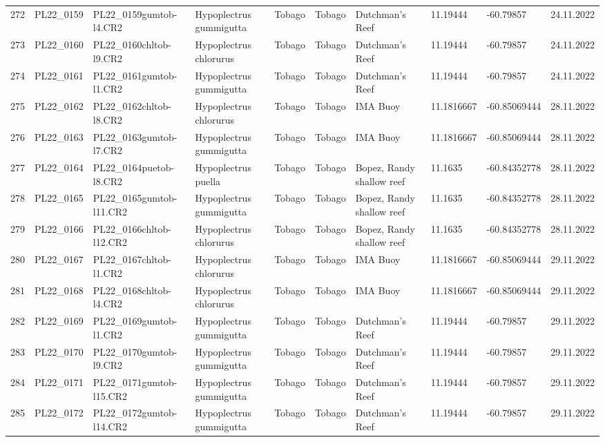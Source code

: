 \begin{table}[ht]
\begin{tabular}{rlllllllll}
  272 & PL22\_0159 & PL22\_0159gumtob-l4.CR2 & Hypoplectrus gummigutta & Tobago & Tobago & Dutchman's Reef & 11.19444 & -60.79857 & 24.11.2022 \\ 
  273 & PL22\_0160 & PL22\_0160chltob-l9.CR2 & Hypoplectrus chlorurus & Tobago & Tobago & Dutchman's Reef & 11.19444 & -60.79857 & 24.11.2022 \\ 
  274 & PL22\_0161 & PL22\_0161gumtob-l1.CR2 & Hypoplectrus gummigutta & Tobago & Tobago & Dutchman's Reef & 11.19444 & -60.79857 & 24.11.2022 \\ 
  275 & PL22\_0162 & PL22\_0162chltob-l8.CR2 & Hypoplectrus chlorurus & Tobago & Tobago & IMA Buoy & 11.1816667 & -60.85069444 & 28.11.2022 \\ 
  276 & PL22\_0163 & PL22\_0163gumtob-l7.CR2 & Hypoplectrus gummigutta & Tobago & Tobago & IMA Buoy & 11.1816667 & -60.85069444 & 28.11.2022 \\ 
  277 & PL22\_0164 & PL22\_0164puetob-l8.CR2 & Hypoplectrus puella & Tobago & Tobago & Bopez, Randy shallow reef & 11.1635 & -60.84352778 & 28.11.2022 \\ 
  278 & PL22\_0165 & PL22\_0165gumtob-l11.CR2 & Hypoplectrus gummigutta & Tobago & Tobago & Bopez, Randy shallow reef & 11.1635 & -60.84352778 & 28.11.2022 \\ 
  279 & PL22\_0166 & PL22\_0166chltob-l12.CR2 & Hypoplectrus chlorurus & Tobago & Tobago & Bopez, Randy shallow reef & 11.1635 & -60.84352778 & 28.11.2022 \\ 
  280 & PL22\_0167 & PL22\_0167chltob-l1.CR2 & Hypoplectrus chlorurus & Tobago & Tobago & IMA Buoy & 11.1816667 & -60.85069444 & 29.11.2022 \\ 
  281 & PL22\_0168 & PL22\_0168chltob-l4.CR2 & Hypoplectrus chlorurus & Tobago & Tobago & IMA Buoy & 11.1816667 & -60.85069444 & 29.11.2022 \\ 
  282 & PL22\_0169 & PL22\_0169gumtob-l1.CR2 & Hypoplectrus gummigutta & Tobago & Tobago & Dutchman's Reef & 11.19444 & -60.79857 & 29.11.2022 \\ 
  283 & PL22\_0170 & PL22\_0170gumtob-l9.CR2 & Hypoplectrus gummigutta & Tobago & Tobago & Dutchman's Reef & 11.19444 & -60.79857 & 29.11.2022 \\ 
  284 & PL22\_0171 & PL22\_0171gumtob-l15.CR2 & Hypoplectrus gummigutta & Tobago & Tobago & Dutchman's Reef & 11.19444 & -60.79857 & 29.11.2022 \\ 
  285 & PL22\_0172 & PL22\_0172gumtob-l14.CR2 & Hypoplectrus gummigutta & Tobago & Tobago & Dutchman's Reef & 11.19444 & -60.79857 & 29.11.2022 \\ 

\end{tabular}
\end{table}

